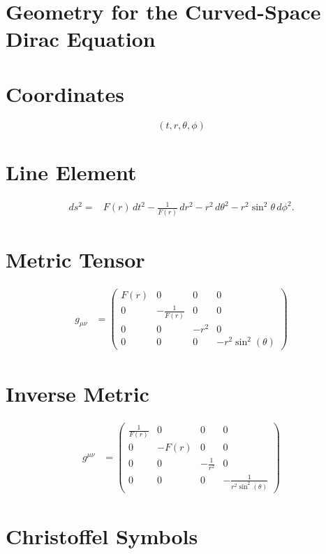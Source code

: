 \documentclass[12pt,fleqn]{article}
\begin{document}
\section*{Geometry for the Curved-Space Dirac Equation}

\section*{Coordinates}

\[
(t,r,\theta,\phi)
\]

\section*{Line Element}

\[
\begin{aligned}
ds^2
={}&
F(r)\,dt^2
-\frac{1}{F(r)}\,dr^2
-r^2\,d\theta^2
-r^2\sin^2\theta\,d\phi^2 .
\end{aligned}
\]

\section*{Metric Tensor}

\[
\begin{aligned}
g_{\mu\nu} &=
\begin{pmatrix}
F{\left(r \right)} & 0 & 0 & 0 \\
0 & - \frac{1}{F{\left(r \right)}} & 0 & 0 \\
0 & 0 & - r^{2} & 0 \\
0 & 0 & 0 & - r^{2} \sin^{2}{\left(\theta \right)}
\end{pmatrix}
\end{aligned}
\]

\section*{Inverse Metric}

\[
\begin{aligned}
g^{\mu\nu} &=
\begin{pmatrix}
\frac{1}{F{\left(r \right)}} & 0 & 0 & 0 \\
0 & - F{\left(r \right)} & 0 & 0 \\
0 & 0 & - \frac{1}{r^{2}} & 0 \\
0 & 0 & 0 & - \frac{1}{r^{2} \sin^{2}{\left(\theta \right)}}
\end{pmatrix}
\end{aligned}
\]

\section*{Christoffel Symbols}
\end{document}
